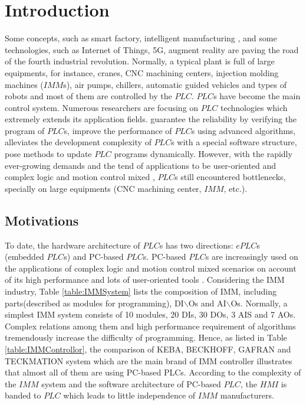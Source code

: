 \documentclass[journal,UTF8]{IEEEtran}
\begin{document}
\section{Introduction}
Some concepts, such as smart factory, intelligent manufacturing \cite{Gonzalez2017Supervisory,Chekired2018Industrial}, and some technologies, such as Internet of Things, 5G, augment reality \cite{Li2018Energy,Ling20185G} are paving the road of the fourth industrial revolution. Normally, a typical plant is full of large equipments, for instance, cranes, CNC machining centers, injection molding machines ($IMM$s), air pumps, chillers, automatic guided vehicles and types of robots and most of them are controlled by the $PLC$. $PLC$s have become the main control system. Numerous researchers are focusing on $PLC$ technologies which extremely extends its application fields. \cite{Jiang2013System,Jiang2013Bayesian,Adiego2015Applying} guarantee the reliability by verifying the program of $PLC$s, \cite{Gerk2006Advanced,Chang2007Adaptive,Dominic2016PLC} improve the performance of $PLC$s using advanced algorithms, \cite{WuA} alleviates the development complexity of $PLC$s with a special software structure, \cite{Sch2013Development,Morenas2017Shop} pose methods to update $PLC$ programs dynamically.
However, with the rapidly ever-growing demands and the tend of applications to be user-oriented and complex logic and motion control mixed \cite{Zaeh2005A,Hossain2014Advanced}, $PLC$s still encountered bottlenecks, specially on large equipments (CNC machining center, $IMM$, etc.).

\subsection{Motivations}
To date, the hardware architecture of $PLC$s has two directions: $ePLC$s (embedded $PLC$s) and PC-based $PLC$s. PC-based $PLC$s are increasingly used on the applications of complex logic and motion control mixed scenarios on account of its high performance and lots of user-oriented tools \cite{Hossain2014Advanced}. Considering the IMM industry, Table \ref{table:IMMSystem} lists the composition of IMM, including parts(described as modules for programming), DI$\backslash$Os and AI$\backslash$Os. Normally, a simplest IMM system consists of 10 modules, 20 DIs, 30 DOs, 3 AIS and 7 AOs. Complex relations among them and high performance requirement of algorithms tremendously increase the difficulty of programming. Hence, as listed in Table \ref{table:IMMControllor}, the comparison of KEBA, BECKHOFF, GAFRAN and TECKMATION system which are the main brand of IMM controller illustrates that almost all of them are using PC-based PLCs. According to the complexity of the $IMM$ system and the software architecture of PC-based $PLC$, the $HMI$ is banded to $PLC$ which leads to little independence of $IMM$ manufacturers. 
\end{document}
